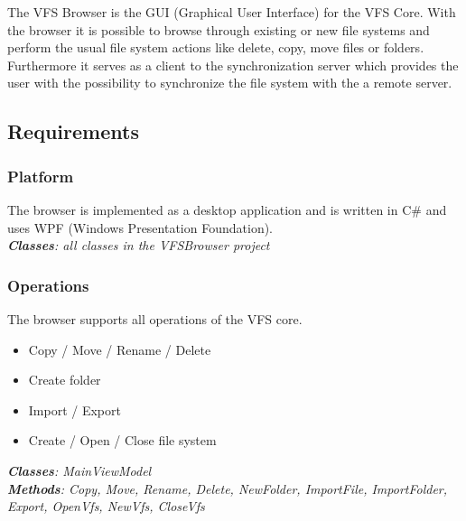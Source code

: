 \documentclass[JCDReport.tex]{subfiles}
\begin{document}
The VFS Browser is the GUI (Graphical User Interface) for the VFS Core.
With the browser it is possible to browse through existing or new file systems and perform the usual file system actions like delete, copy, move files or folders. Furthermore it serves as a client to the synchronization server which provides the user with the possibility to synchronize the file system with the a remote server.

\subsection{Requirements}

\subsubsection{Platform}
The browser is implemented as a desktop application and is written in C\# and uses WPF (Windows Presentation Foundation).\\
\textit{\textbf{Classes}: all classes in the VFSBrowser project}

\subsubsection{Operations}
The browser supports all operations of the VFS core.
\begin{itemize}
  \item Copy / Move / Rename / Delete
  \item Create folder
  \item Import / Export
  \item Create / Open / Close file system
\end{itemize}
\textit{\textbf{Classes}: MainViewModel\\
\textbf{Methods}: Copy, Move, Rename, Delete, NewFolder, ImportFile, ImportFolder, Export, OpenVfs, NewVfs, CloseVfs}
\end{document}
